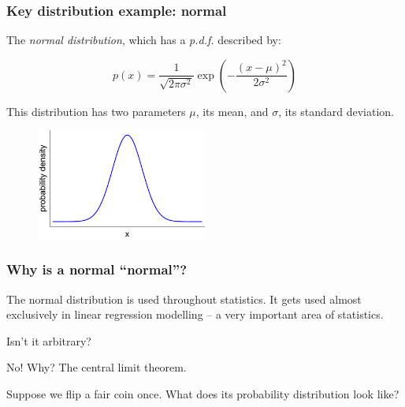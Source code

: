 \documentclass{beamer}
\begin{document}
	\begin{frame}
		\frametitle{Key distribution example: normal}
		
		The \textit{normal distribution}, which has a \textit{p.d.f.} described by:
		
		\begin{equation}
		p(x) = \frac{1}{\sqrt{2\pi\sigma^2}} \exp(-\frac{(x-\mu)^2}{2\sigma^2})
		\end{equation}
		
		This distribution has two parameters $\mu$, its mean, and $\sigma$, its standard deviation.
		
		\begin{figure}[ht]
			\centerline{\includegraphics[width=0.5\textwidth]{./figures/normal_distribution.pdf}}
		\end{figure}
		
	\end{frame}
	
	\begin{frame}
		\frametitle{Why is a normal ``normal''?}
		
		The normal distribution is used throughout statistics. It gets used almost exclusively in linear regression modelling -- a very important area of statistics.
		
		\vspace{0.5cm}
				
		Isn't it arbitrary?
		
		\vspace{0.5cm}
		
		No! Why? The central limit theorem. 
		
		\vspace{0.5cm}
		
		Suppose we flip a fair coin once. What does its probability distribution look like?
		
	\end{frame}
	
\end{document}
